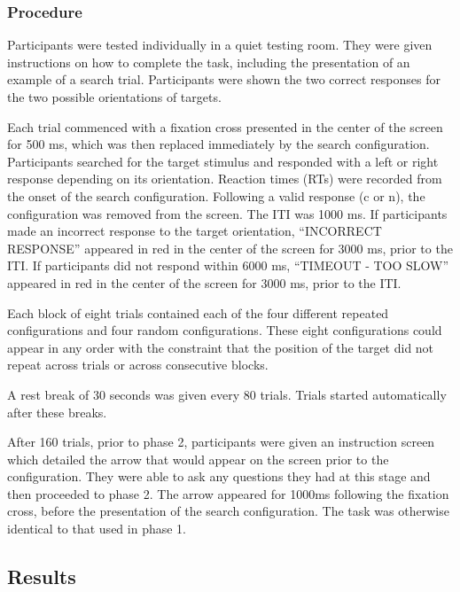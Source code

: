 \documentclass[
  man,
  floatsintext,
  longtable,
  nolmodern,
  notxfonts,
  notimes,
  colorlinks=true,linkcolor=blue,citecolor=blue,urlcolor=blue]{apa7}
\begin{document}
\subsubsection{Procedure}\label{procedure}

Participants were tested individually in a quiet testing room. They were
given instructions on how to complete the task, including the
presentation of an example of a search trial. Participants were shown
the two correct responses for the two possible orientations of targets.

Each trial commenced with a fixation cross presented in the center of
the screen for 500 ms, which was then replaced immediately by the search
configuration. Participants searched for the target stimulus and
responded with a left or right response depending on its orientation.
Reaction times (RTs) were recorded from the onset of the search
configuration. Following a valid response (c or n), the configuration
was removed from the screen. The ITI was 1000 ms. If participants made
an incorrect response to the target orientation, ``INCORRECT RESPONSE''
appeared in red in the center of the screen for 3000 ms, prior to the
ITI. If participants did not respond within 6000 ms, ``TIMEOUT - TOO
SLOW'' appeared in red in the center of the screen for 3000 ms, prior to
the ITI.

Each block of eight trials contained each of the four different repeated
configurations and four random configurations. These eight
configurations could appear in any order with the constraint that the
position of the target did not repeat across trials or across
consecutive blocks.

A rest break of 30 seconds was given every 80 trials. Trials started
automatically after these breaks.

After 160 trials, prior to phase 2, participants were given an
instruction screen which detailed the arrow that would appear on the
screen prior to the configuration. They were able to ask any questions
they had at this stage and then proceeded to phase 2. The arrow appeared
for 1000ms following the fixation cross, before the presentation of the
search configuration. The task was otherwise identical to that used in
phase 1.

\subsection{Results}\label{results}
\end{document}
